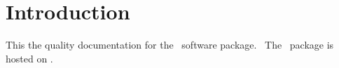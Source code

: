 \documentclass{article}
\begin{document}

\tableofcontents



\clearpage
\pagestyle{long}


\graphicspath{{uml/}{latex/}}

\section{Introduction}\label{introduction}

This the quality documentation for the \packagename\ software package.
\packagedescription\ The \packagename\ package is hosted on \packageurl.
\end{document}
